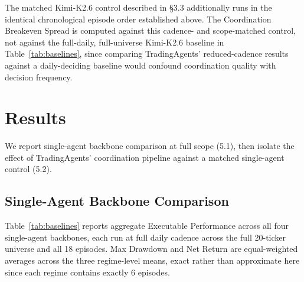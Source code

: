 \documentclass{article}
\begin{document}
The matched Kimi-K2.6 control described in \S3.3 additionally runs in the identical chronological episode order established above. The Coordination Breakeven Spread is computed against this cadence- and scope-matched control, not against the full-daily, full-universe Kimi-K2.6 baseline in Table~\ref{tab:baselines}, since comparing TradingAgents' reduced-cadence results against a daily-deciding baseline would confound coordination quality with decision frequency.

\section{Results}

We report single-agent backbone comparison at full scope (5.1), then isolate the effect of TradingAgents' coordination pipeline against a matched single-agent control (5.2).

\subsection{Single-Agent Backbone Comparison}

Table~\ref{tab:baselines} reports aggregate Executable Performance across all four single-agent backbones, each run at full daily cadence across the full 20-ticker universe and all 18 episodes. Max Drawdown and Net Return are equal-weighted averages across the three regime-level means, exact rather than approximate here since each regime contains exactly 6 episodes.

\begin{table}[h]
  \caption{Aggregate Executable Performance across the four single-agent backbones.}
  \label{tab:baselines}
  \centering
\end{table}
\end{document}
